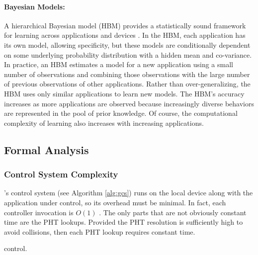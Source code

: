 \paragraph{ Bayesian Models:} A hierarchical Bayesian model (HBM)
provides a statistically sound framework for learning across
applications and devices \cite{LEO}.  In the HBM, each application has
its own model, allowing specificity, but these models are
conditionally dependent on some underlying probability distribution
with a hidden mean and co-variance.  In practice, an HBM estimates a
model for a new application using a small number of observations and
combining those observations with the large number of previous
observations of other applications.  Rather than over-generalizing,
the HBM uses only similar applications to learn new models.  The HBM's
accuracy increases as more applications are observed because
increasingly diverse behaviors are represented in the pool of prior
knowledge.  Of course, the computational complexity of learning also
increases with increasing applications.


\subsection{Formal Analysis}
\subsubsection{Control System Complexity}

\SYSTEM{}'s control system (see Algorithm \ref{alg:gcs}) runs on the
local device along with the application under control, so its overhead
must be minimal.  In fact, each controller invocation is $O(1)$ .  The
only parts that are not obviously constant time are the PHT lookups.
Provided the PHT resolution is sufficiently high to avoid collisions,
then each PHT lookup requires constant time.
\begin{algorithm}[t]
\caption{\SYSTEM{} control.}
\label{alg:gcs}
\end{algorithm}

